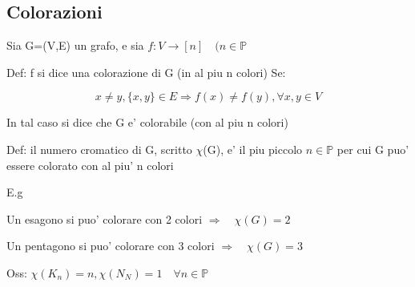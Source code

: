 \documentclass{article}
\begin{document}
        \subsection{Colorazioni}
        \begin{flushleft}
          Sia G=(V,E) un grafo, e sia $f:V\to [n] \quad (n \in \mathbb{P}$
        \end{flushleft}
        \begin{flushleft}
          Def: f si dice una colorazione di G (in al piu n colori) Se:
        \end{flushleft}
        \begin{equation*}
          x \neq y,\{x,y\}\in E\Rightarrow f(x)\neq f(y), \forall x,y \in V
        \end{equation*}
        \begin{flushleft}
          In tal caso si dice che G e' colorabile (con al piu n colori)
        \end{flushleft}
        \begin{flushleft}
          Def: il numero cromatico di G, scritto $\chi$(G), e' il piu piccolo $n\in \mathbb{P}$ per cui G puo' essere colorato con al piu' n colori
        \end{flushleft}
        E.g
        \begin{flushleft}
          Un esagono si puo' colorare con 2 colori $\Rightarrow \quad \chi(G)=2$
        \end{flushleft}
        \begin{flushleft}
          Un pentagono si puo' colorare con 3 colori $\Rightarrow \quad \chi(G)=3$
        \end{flushleft}
        \begin{flushleft}
          Oss: $\chi(K_n)=n,\chi(N_N)=1 \quad \forall n \in \mathbb{P}$
        \end{flushleft}
\end{document}
